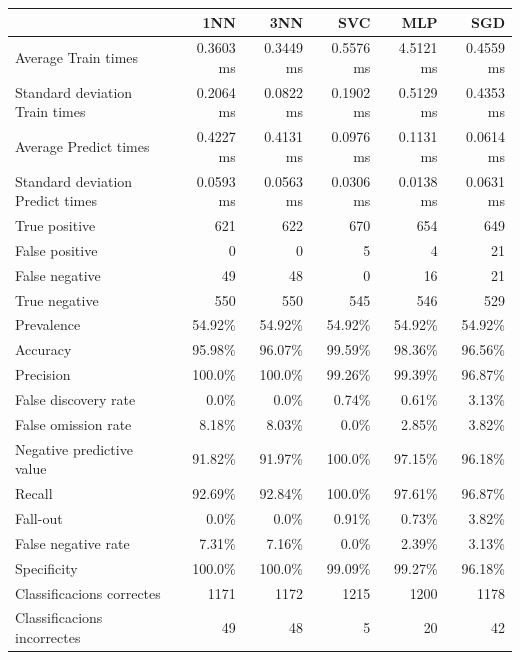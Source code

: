 \documentclass{article} %
\begin{document}
{	\begin{changemargin}{-2.5cm}{0.5cm}
	{\selectfont\small
	\begin{tabular}{l | r r r r r}
		& 1NN & 3NN & SVC & MLP & SGD \\ \hline
		Average Train times & 0.3603 ms & 0.3449 ms & 0.5576 ms & 4.5121 ms & 0.4559 ms \\
		Standard deviation Train times & 0.2064 ms & 0.0822 ms & 0.1902 ms & 0.5129 ms & 0.4353 ms \\ \hline
		Average Predict times & 0.4227 ms & 0.4131 ms & 0.0976 ms & 0.1131 ms & 0.0614 ms \\
		Standard deviation Predict times & 0.0593 ms & 0.0563 ms & 0.0306 ms & 0.0138 ms & 0.0631 ms \\ \hline
		True positive & 621 & 622 & 670 & 654 & 649 \\
		False positive & 0 & 0 & 5 & 4 & 21 \\
		False negative & 49 & 48 & 0 & 16 & 21 \\
		True negative & 550 & 550 & 545 & 546 & 529 \\ \hline
		Prevalence & 54.92\% & 54.92\% & 54.92\% & 54.92\% & 54.92\% \\
		Accuracy & 95.98\% & 96.07\% & 99.59\% & 98.36\% & 96.56\% \\ \hline
		Precision & 100.0\% & 100.0\% & 99.26\% & 99.39\% & 96.87\% \\
		False discovery rate & 0.0\% & 0.0\% & 0.74\% & 0.61\% & 3.13\% \\
		False omission rate & 8.18\% & 8.03\% & 0.0\% & 2.85\% & 3.82\% \\
		Negative predictive value & 91.82\% & 91.97\% & 100.0\% & 97.15\% & 96.18\% \\ \hline
		Recall & 92.69\% & 92.84\% & 100.0\% & 97.61\% & 96.87\% \\
		Fall-out & 0.0\% & 0.0\% & 0.91\% & 0.73\% & 3.82\% \\
		False negative rate & 7.31\% & 7.16\% & 0.0\% & 2.39\% & 3.13\% \\
		Specificity & 100.0\% & 100.0\% & 99.09\% & 99.27\% & 96.18\% \\ \hline
		Classificacions correctes & 1171 & 1172 & 1215 & 1200 & 1178 \\
		Classificacions incorrectes & 49 & 48 & 5 & 20 & 42 \\
	\end{tabular}
	}
	\end{changemargin}
	
}
\end{document}
